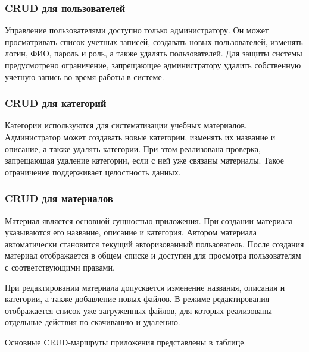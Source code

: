 \subsubsection*{CRUD для пользователей}

Управление пользователями доступно только администратору. Он может просматривать список учетных записей, создавать новых пользователей, изменять логин, ФИО, пароль и роль, а также удалять пользователей. Для защиты системы предусмотрено ограничение, запрещающее администратору удалить собственную учетную запись во время работы в системе.

\subsubsection*{CRUD для категорий}

Категории используются для систематизации учебных материалов. Администратор может создавать новые категории, изменять их название и описание, а также удалять категории. При этом реализована проверка, запрещающая удаление категории, если с ней уже связаны материалы. Такое ограничение поддерживает целостность данных.

\subsubsection*{CRUD для материалов}

Материал является основной сущностью приложения. При создании материала указываются его название, описание и категория. Автором материала автоматически становится текущий авторизованный пользователь. После создания материал отображается в общем списке и доступен для просмотра пользователям с соответствующими правами.

При редактировании материала допускается изменение названия, описания и категории, а также добавление новых файлов. В режиме редактирования отображается список уже загруженных файлов, для которых реализованы отдельные действия по скачиванию и удалению.

Основные CRUD-маршруты приложения представлены в таблице.

